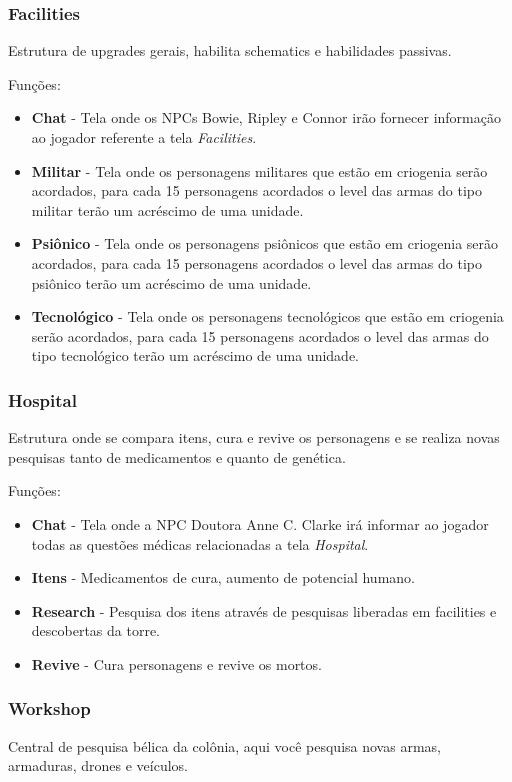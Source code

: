 \documentclass[11pt]{article} %
\begin{document}
\subsubsection{Facilities}
Estrutura de upgrades gerais, habilita schematics e habilidades passivas.

Funções:
\begin{itemize}
  \item \textbf{Chat} - Tela onde os NPCs Bowie, Ripley e Connor irão fornecer informação ao jogador referente a tela \textit{Facilities}.
  \item \textbf{Militar} - Tela onde os personagens militares que estão em criogenia serão acordados, para cada 15 personagens acordados o level das armas do tipo militar terão um acréscimo de uma unidade.
  \item \textbf{Psiônico} - Tela onde os personagens psiônicos que estão em criogenia serão acordados, para cada 15 personagens acordados o level das armas do tipo psiônico terão um acréscimo de uma unidade.
  \item \textbf{Tecnológico} - Tela onde os personagens tecnológicos que estão em criogenia serão acordados, para cada 15 personagens acordados o level das armas do tipo tecnológico terão um acréscimo de uma unidade.
\end{itemize}

\subsubsection{Hospital}
Estrutura onde se compara itens, cura e revive os personagens e se realiza novas pesquisas tanto de medicamentos e quanto de genética. 

Funções:
\begin{itemize}
  \item \textbf{Chat} - Tela onde a NPC Doutora Anne C. Clarke irá informar ao jogador todas as questões médicas relacionadas a tela \textit{Hospital}.
  \item \textbf{Itens} - Medicamentos de cura, aumento de potencial humano. 
  \item \textbf{Research} - Pesquisa dos itens através de pesquisas liberadas em facilities e descobertas da torre.
  \item \textbf{Revive} - Cura personagens e revive os mortos. 
\end{itemize}

\subsubsection{Workshop}
Central de pesquisa bélica da colônia, aqui você pesquisa novas armas, armaduras, drones e veículos.
\end{document}
